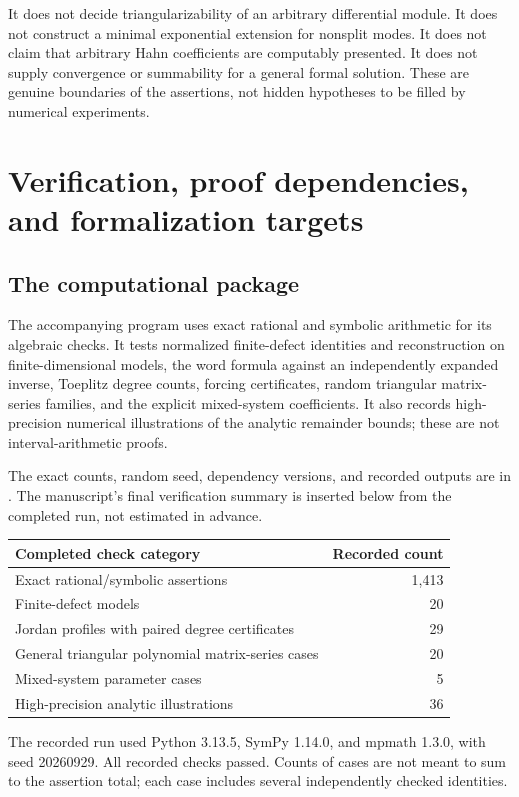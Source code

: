 \documentclass[11pt,a4paper]{article}
\numberwithin{equation}{section}
\theoremstyle{definition}
\theoremstyle{remark}\newtheorem{remark}[theorem]{Remark}
\begin{document}
It does not decide triangularizability of an arbitrary differential module. It does not construct a minimal exponential extension for nonsplit modes. It does not claim that arbitrary Hahn coefficients are computably presented. It does not supply convergence or summability for a general formal solution. These are genuine boundaries of the assertions, not hidden hypotheses to be filled by numerical experiments.

\section{Verification, proof dependencies, and formalization targets}
\label{sec:verification}
\subsection{The computational package}
The accompanying program  uses exact rational and symbolic arithmetic for its algebraic checks. It tests normalized finite-defect identities and reconstruction on finite-dimensional models, the word formula against an independently expanded inverse, Toeplitz degree counts, forcing certificates, random triangular matrix-series families, and the explicit mixed-system coefficients. It also records high-precision numerical illustrations of the analytic remainder bounds; these are not interval-arithmetic proofs.

The exact counts, random seed, dependency versions, and recorded outputs are in . The manuscript's final verification summary is inserted below from the completed run, not estimated in advance.
\begin{center}\small
\begin{tabular}{lr}\toprule
Completed check category & Recorded count\\\midrule
Exact rational/symbolic assertions & 1,413\\
Finite-defect models & 20\\
Jordan profiles with paired degree certificates & 29\\
General triangular polynomial matrix-series cases & 20\\
Mixed-system parameter cases & 5\\
High-precision analytic illustrations & 36\\
\bottomrule\end{tabular}\end{center}
The recorded run used Python 3.13.5, SymPy 1.14.0, and mpmath 1.3.0, with seed 20260929. All recorded checks passed. Counts of cases are not meant to sum to the assertion total; each case includes several independently checked identities.
\end{document}
